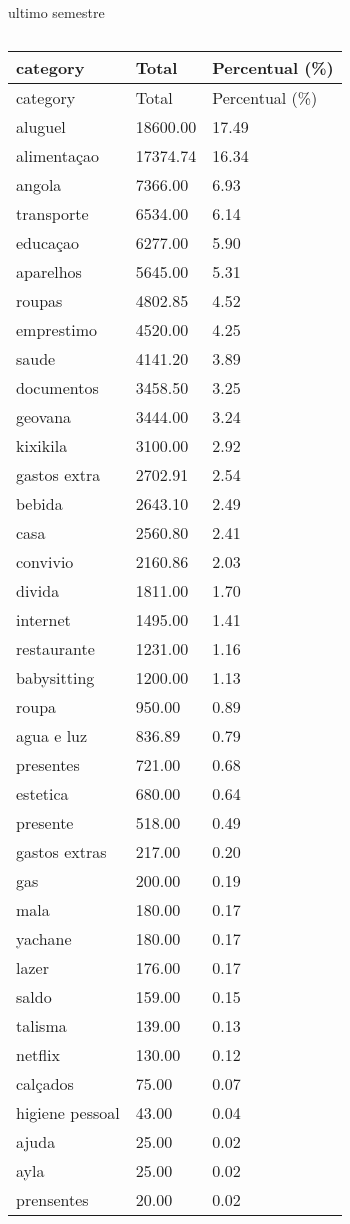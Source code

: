 \documentclass[
  8pt,
  a4paper,
  DIV=11,
  numbers=noendperiod]{scrartcl}
\begin{document}
\begin{figure}
\begin{minipage}{0.50\linewidth}
\end{minipage}%
%
\begin{minipage}{0.50\linewidth}
ultimo semestre

\begin{longtable}[]{@{}lll@{}}
\caption{}\label{T_b582b}\tabularnewline
\toprule\noalign{}
category & Total & Percentual (\%) \\
\midrule\noalign{}
\endfirsthead
\toprule\noalign{}
category & Total & Percentual (\%) \\
\midrule\noalign{}
\endhead
\bottomrule\noalign{}
\endlastfoot
aluguel & 18600.00 & 17.49 \\
alimentaçao & 17374.74 & 16.34 \\
angola & 7366.00 & 6.93 \\
transporte & 6534.00 & 6.14 \\
educaçao & 6277.00 & 5.90 \\
aparelhos & 5645.00 & 5.31 \\
roupas & 4802.85 & 4.52 \\
emprestimo & 4520.00 & 4.25 \\
saude & 4141.20 & 3.89 \\
documentos & 3458.50 & 3.25 \\
geovana & 3444.00 & 3.24 \\
kixikila & 3100.00 & 2.92 \\
gastos extra & 2702.91 & 2.54 \\
bebida & 2643.10 & 2.49 \\
casa & 2560.80 & 2.41 \\
convivio & 2160.86 & 2.03 \\
divida & 1811.00 & 1.70 \\
internet & 1495.00 & 1.41 \\
restaurante & 1231.00 & 1.16 \\
babysitting & 1200.00 & 1.13 \\
roupa & 950.00 & 0.89 \\
agua e luz & 836.89 & 0.79 \\
presentes & 721.00 & 0.68 \\
estetica & 680.00 & 0.64 \\
presente & 518.00 & 0.49 \\
gastos extras & 217.00 & 0.20 \\
gas & 200.00 & 0.19 \\
mala & 180.00 & 0.17 \\
yachane & 180.00 & 0.17 \\
lazer & 176.00 & 0.17 \\
saldo & 159.00 & 0.15 \\
talisma & 139.00 & 0.13 \\
netflix & 130.00 & 0.12 \\
calçados & 75.00 & 0.07 \\
higiene pessoal & 43.00 & 0.04 \\
ajuda & 25.00 & 0.02 \\
ayla & 25.00 & 0.02 \\
prensentes & 20.00 & 0.02 \\
\end{longtable}


\end{minipage}
\end{figure}
\end{document}
